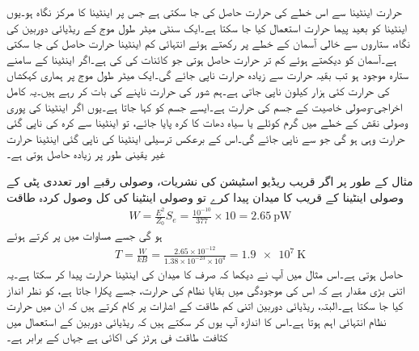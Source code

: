 حرارت اینٹینا سے اس خطے کی حرارت حاصل کی جا سکتی ہے جس پر اینٹینا کا مرکز نگاہ ہو۔یوں اینٹینا کو بعید پیما حرارت استعمال کیا جا سکتا ہے۔ایک سنٹی میٹر طول موج کے ریڈیائی دوربین کی نگاہ، ستاروں سے خالی آسمان کے خطے پر رکھتے ہوئے انتہائی کم اینٹینا حرارت  حاصل کی جا سکتی ہے۔آسمان کو دیکھتے ہوئے کم تر حرارت  حاصل ہوتی جو کائنات کی  کی  ہے۔اگر اینٹینا کے سامنے ستارہ موجود ہو تب بقیہ حرارت سے زیادہ حرارت ناپی جائے گی۔ایک میٹر طول موج پر ہماری کہکشاں کی حرارت کئی ہزار کیلون ناپی جاتی ہے۔ہم  شور کی حرارت ناپنے کی بات کر رہے ہیں۔یہ کامل اخراجی-وصولی خاصیت کے جسم کی حرارت ہے۔ایسے جسم کو   کہا جاتا ہے۔یوں اگر اینٹینا کی پوری وصولی نقش کے خطے میں گرم کوئلے یا سیاہ دھات کا کرہ پایا جائے، تو اینٹینا سے کرہ کی ناپی گئی حرارت وہی ہو گی جو  سے ناپی جائے گی۔اس کے  برعکس ترسیلی اینٹینا کی ناپی گئی اینٹینا حرارت غیر یقینی طور پر زیادہ حاصل ہوتی ہے۔   

مثال کے طور پر  اگر قریب ریڈیو اسٹیشن کی نشریات،  وصولی رقبے اور  تعددی پٹی کے وصولی اینٹینا کے قریب  کا میدان پیدا کرے تو وصولی اینٹینا کی کل وصول کردہ طاقت
\begin{align*}
W=\frac{E^2}{Z_0} S_e=\frac{10^{-10}}{377} \times 10=\SI{2.65}{\pico \watt}
\end{align*}
ہو گی جسے مساوات  میں پر کرتے ہوئے
\begin{align*}
T=\frac{W}{k B}=\frac{2.65\times 10^{-12}}{1.38\times 10^{-23}\times 10^4}=\SI{1.9e7}{\kelvin}
\end{align*}
حاصل ہوتی ہے۔اس مثال میں آپ نے دیکھا کہ صرف  کا میدان   کی اینٹینا حرارت پیدا کر سکتا ہے۔یہ اتنی بڑی مقدار ہے کہ اس کی موجودگی میں بقایا نظام کی حرارت، جسے  پکارا جاتا ہے، کو نظر انداز کیا جا سکتا ہے۔البتہ، ریڈیائی دوربین اتنی کم طاقت کے اشارات پر کام کرتے ہیں کہ ان میں حرارت نظام انتہائی اہم ہوتا ہے۔اس کا اندازہ آپ یوں کر سکتے ہیں کہ ریڈیائی دوربین کے استعمال میں کثافت طاقت فی ہرٹز کی اکائی  ہے جہاں  کے برابر ہے۔

